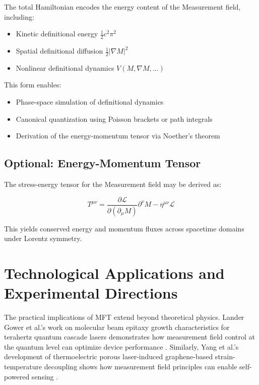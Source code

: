 The total Hamiltonian encodes the energy content of the Measurement field, including:

\begin{itemize}
  \item Kinetic definitional energy \( \frac{1}{2} c^2 \pi^2 \)
  \item Spatial definitional diffusion \( \frac{1}{2} |\nabla M|^2 \)
  \item Nonlinear definitional dynamics \( V(M, \nabla M, ...) \)
\end{itemize}

This form enables:

\begin{itemize}
  \item Phase-space simulation of definitional dynamics
  \item Canonical quantization using Poisson brackets or path integrals
  \item Derivation of the energy-momentum tensor via Noether's theorem
\end{itemize}

\subsection{Optional: Energy-Momentum Tensor}

The stress-energy tensor for the Measurement field may be derived as:

\begin{equation}
T^{\mu\nu} = \frac{\partial \mathcal{L}}{\partial(\partial_\mu M)} \partial^\nu M - \eta^{\mu\nu} \mathcal{L}
\end{equation}

This yields conserved energy and momentum fluxes across spacetime domains under Lorentz symmetry.


\section{Technological Applications and Experimental Directions}

The practical implications of MFT extend beyond theoretical physics. Lander Gower et al.'s work on molecular beam epitaxy growth characteristics for terahertz quantum cascade lasers demonstrates how measurement field control at the quantum level can optimize device performance \cite{lander_gower_exploring_2024}. Similarly, Yang et al.'s development of thermoelectric porous laser-induced graphene-based strain-temperature decoupling shows how measurement field principles can enable self-powered sensing \cite{yang2025}.


